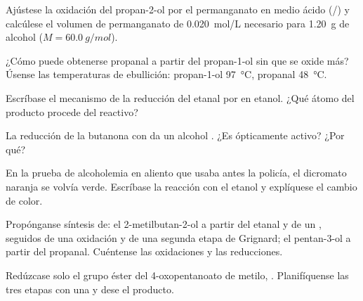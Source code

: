 \begin{exercise}[$\star\star$]\label{exo:b1:organic-redox:5}
Ajústese la oxidación del propan-2-ol por el permanganato en medio ácido
(/) y calcúlese el volumen de permanganato de
\qty{0.020}{mol/L} necesario para \qty{1.20}{g} de alcohol ($M = \qty{60.0}{g/mol}$).
\end{exercise}

\begin{exercise}[$\star\star$]\label{exo:b1:organic-redox:6}
¿Cómo puede obtenerse propanal a partir del propan-1-ol sin que se oxide
más? Úsense las temperaturas de ebullición: propan-1-ol
\qty{97}{\celsius}, propanal
\qty{48}{\celsius}.
\end{exercise}

\begin{exercise}[$\star\star$]\label{exo:b1:organic-redox:7}
Escríbase el mecanismo de la reducción del etanal por  en
etanol. ¿Qué átomo del producto procede del reactivo?
\end{exercise}

\begin{exercise}[$\star\star$]\label{exo:b1:organic-redox:8}
La reducción de la butanona con  da un alcohol . ¿Es
ópticamente activo? ¿Por qué?
\end{exercise}

\begin{exercise}[$\star\star$]\label{exo:b1:organic-redox:9}
En la prueba de alcoholemia en aliento que usaba antes la policía, el
dicromato naranja se volvía verde. Escríbase la reacción con el etanol y
explíquese el cambio de color.
\end{exercise}

\begin{exercise}[$\star\star\star$]\label{exo:b1:organic-redox:10}
Propónganse síntesis de: el 2-metilbutan-2-ol a partir del etanal y de un
, seguidos de una oxidación y de una segunda etapa de
Grignard; el pentan-3-ol a partir del propanal. Cuéntense las oxidaciones
y las reducciones.
\end{exercise}

\begin{exercise}[$\star\star\star$]\label{exo:b1:organic-redox:11}
Redúzcase solo el grupo éster del 4-oxopentanoato de metilo,
. Planifíquense las tres etapas con una 
y dese el producto.
\end{exercise}

